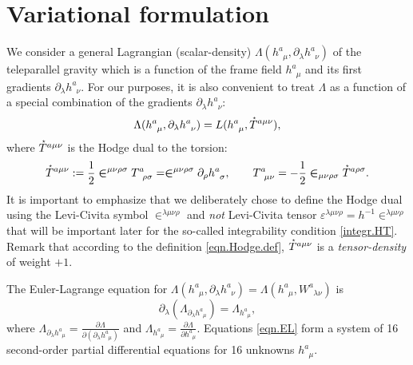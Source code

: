 \documentclass[
10pt, %
a4paper, %
oneside, %
headinclude,footinclude, %
BCOR5mm, %
]{scrartcl}
\newcommand{\IP}[1]{{\color{Red}[IP:\ \ #1]}}
\newcommand{\pd}[1]{\partial_{#1}}
\newcommand{\tetrsymbol}{h}
\newcommand{\tetr}[2]{\tetrsymbol^{#1}_{\phantom{#1}#2}}
\newcommand{\detTetr}{\tetrsymbol}
\newcommand{\D}[1]{\partial_{#1}} %
\newcommand{\Tors}[2]{T^{#1}_{\phantom{a}#2}}
\newcommand{\w}[2]{W^{#1}_{\phantom{#1}#2}}
\newcommand{\Lag}{\Lambda}	%
\newcommand{\Laghodge}{L}%
\newcommand{\LCsymb}{\bm{\in}}    %
\newcommand{\LCtens}{\varepsilon} %
\newcommand{\HDT}[1]{\accentset{\star}{T}^{#1}}
\begin{document}
\section{Variational formulation}


We consider a general Lagrangian (scalar-density) $ \Lag(\tetr{a}{\mu},\pd{\lambda}\tetr{a}{\nu}) $ 
of the teleparallel gravity which is a function of the frame field $ \tetr{a}{\mu} $ and its first 
gradients $ \pd{\lambda}\tetr{a}{\nu} $. For our purposes, it is also convenient to treat $ 
\Lag $ as a function of a special combination of the gradients $ \pd{\lambda}\tetr{a}{\nu} $:
\begin{equation}\label{eqn.Lagrangians}
\Lag(\tetr{a}{\mu},\pd{\lambda}\tetr{a}{\nu}) = 
\Laghodge(\tetr{a}{\mu},\HDT{a\mu\nu}),
\end{equation}
where $ \HDT{a\mu\nu} $ is the Hodge dual to the 
torsion:
\begin{equation}\label{eqn.Hodge.def}
\HDT{a\mu\nu} := \frac{1}{2}\LCsymb^{\mu\nu\rho\sigma}\Tors{a}{\rho\sigma} = 
\LCsymb^{\mu\nu\rho\sigma}\D{\rho}\tetr{a}{\sigma}, \qquad \Tors{a}{\mu\nu} = 
-\frac{1}{2}\LCsymb_{\mu\nu\rho\sigma}\HDT{a\rho\sigma}.
\end{equation}
It is important to emphasize that we deliberately chose to define the Hodge dual using the 
Levi-Civita symbol $ 
\LCsymb^{\lambda\mu\nu\rho} $ and \emph{not} Levi-Civita tensor $ \LCtens^{\lambda\mu\nu\rho} = 
\detTetr^{-1} 
\LCsymb^{\lambda\mu\nu\rho} $ that will be important later for 
the so-called integrability condition \eqref{integr.HT}.
Remark that according to the definition \eqref{eqn.Hodge.def}, $ \HDT{a\mu\nu} $ is a  
\emph{tensor-density} of weight $ +1 $.



The Euler-Lagrange equation for $ \Lag(\tetr{a}{\mu},\pd{\lambda}\tetr{a}{\nu}) = \Lag(\tetr{a}{\mu},\w{a}{\lambda\nu}) $ is
\begin{equation}\label{eqn.EL}
\pd{\lambda}(\Lag_{\pd{\lambda}\tetr{a}{\mu}}) = \Lag_{\tetr{a}{\mu}},
\end{equation}
where $ \Lag_{\pd{\lambda}\tetr{a}{\mu}} = \frac{\partial 
\Lag}{\partial(\pd{\lambda}\tetr{a}{\mu})} $ and $ 
\Lag_{\tetr{a}{\mu}} = \frac{\partial \Lag}{\partial\tetr{a}{\mu}} $. Equations \eqref{eqn.EL} 
form a system of 16 second-order partial differential equations for 16 unknowns $ \tetr{a}{\mu} $.
\end{document}
